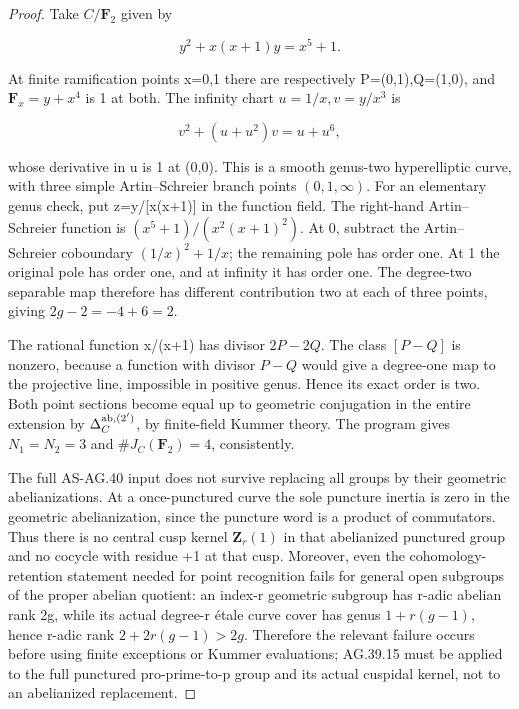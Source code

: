 \documentclass[11pt,a4paper]{article}
\begin{document}
\begin{proof}

Take \(C/\mathbf{F}_2\) given by

\[y^2+x(x+1)y=x^5+1.\]

At finite ramification points x=0,1 there are respectively P=(0,1),Q=(1,0), and \(\mathbf{F}_x=y+x^4\) is 1 at both. The infinity chart \(u=1/x,v=y/x^3\) is

\[v^2+(u+u^2)v=u+u^6,\]

whose derivative in u is 1 at (0,0). This is a smooth genus-two hyperelliptic curve, with three simple Artin--Schreier branch points \((0,1,{\infty})\). For an elementary genus check, put z=y/{[}x(x+1){]} in the function field. The right-hand Artin--Schreier function is \((x^5+1)/(x^2(x+1)^2)\). At 0, subtract the Artin--Schreier coboundary \((1/x)^2+1/x\); the remaining pole has order one. At 1 the original pole has order one, and at infinity it has order one. The degree-two separable map therefore has different contribution two at each of three points, giving \(2g-2=-4+6=2\).

The rational function x/(x+1) has divisor \(2P-2Q\). The class \([P-Q]\) is nonzero, because a function with divisor \(P-Q\) would give a degree-one map to the projective line, impossible in positive genus. Hence its exact order is two. Both point sections become equal up to geometric conjugation in the entire extension by \(\Delta_C^{\rm ab,(2')}\), by finite-field Kummer theory. The program gives \(N_1=N_2=3\) and \(\#J_C(\mathbf{F}_2)=4\), consistently.

The full AS-AG.40 input does not survive replacing all groups by their geometric abelianizations. At a once-punctured curve the sole puncture inertia is zero in the geometric abelianization, since the puncture word is a product of commutators. Thus there is no central cusp kernel \(\mathbf{Z}_r(1)\) in that abelianized punctured group and no cocycle with residue +1 at that cusp. Moreover, even the cohomology-retention statement needed for point recognition fails for general open subgroups of the proper abelian quotient: an index-r geometric subgroup has r-adic abelian rank 2g, while its actual degree-r étale curve cover has genus \(1+r(g-1)\), hence r-adic rank \(2+2r(g-1)>2g\). Therefore the relevant failure occurs before using finite exceptions or Kummer evaluations; AG.39.15 must be applied to the full punctured pro-prime-to-p group and its actual cuspidal kernel, not to an abelianized replacement.


\end{proof}
\end{document}
